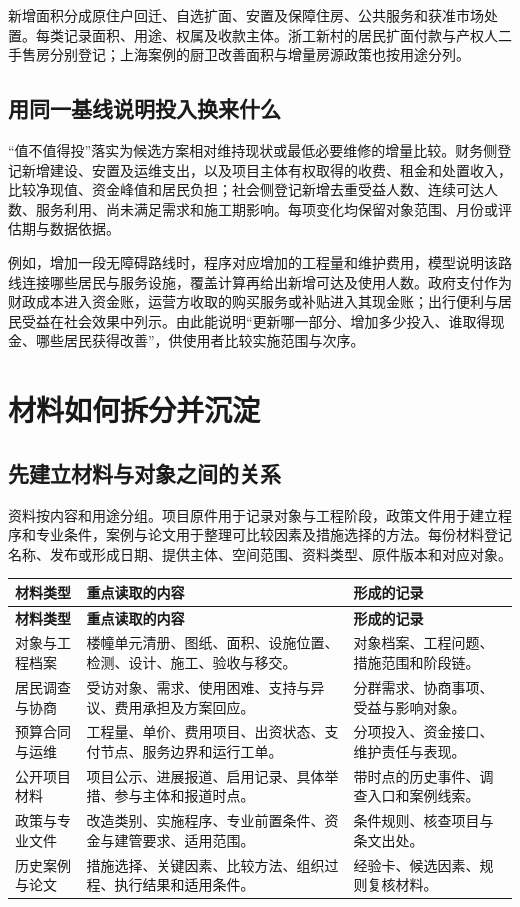 \documentclass[UTF8,11pt,fontset=windows]{ctexart}
\begin{document}
新增面积分成原住户回迁、自选扩面、安置及保障住房、公共服务和获准市场处置。每类记录面积、用途、权属及收款主体。浙工新村的居民扩面付款与产权人二手售房分别登记；上海案例的厨卫改善面积与增量房源政策也按用途分列。\cite{zhegongdata,shmix}

\subsection{用同一基线说明投入换来什么}

“值不值得投”落实为候选方案相对维持现状或最低必要维修的增量比较。财务侧登记新增建设、安置及运维支出，以及项目主体有权取得的收费、租金和处置收入，比较净现值、资金峰值和居民负担；社会侧登记新增去重受益人数、连续可达人数、服务利用、尚未满足需求和施工期影响。每项变化均保留对象范围、月份或评估期与数据依据。

例如，增加一段无障碍路线时，程序对应增加的工程量和维护费用，模型说明该路线连接哪些居民与服务设施，覆盖计算再给出新增可达及使用人数。政府支付作为财政成本进入资金账，运营方收取的购买服务或补贴进入其现金账；出行便利与居民受益在社会效果中列示。由此能说明“更新哪一部分、增加多少投入、谁取得现金、哪些居民获得改善”，供使用者比较实施范围与次序。

\section{材料如何拆分并沉淀}

\subsection{先建立材料与对象之间的关系}

资料按内容和用途分组。项目原件用于记录对象与工程阶段，政策文件用于建立程序和专业条件，案例与论文用于整理可比较因素及措施选择的方法。每份材料登记名称、发布或形成日期、提供主体、空间范围、资料类型、原件版本和对应对象。

\begin{longtable}{@{}L{28mm}L{72mm}L{59mm}@{}}
\toprule
\textbf{材料类型} & \textbf{重点读取的内容} & \textbf{形成的记录}\\
\midrule
\endfirsthead
\toprule
\textbf{材料类型} & \textbf{重点读取的内容} & \textbf{形成的记录}\\
\midrule
\endhead
对象与工程档案 & 楼幢单元清册、图纸、面积、设施位置、检测、设计、施工、验收与移交。 & 对象档案、工程问题、措施范围和阶段链。\\
居民调查与协商 & 受访对象、需求、使用困难、支持与异议、费用承担及方案回应。 & 分群需求、协商事项、受益与影响对象。\\
预算合同与运维 & 工程量、单价、费用项目、出资状态、支付节点、服务边界和运行工单。 & 分项投入、资金接口、维护责任与表现。\\
公开项目材料 & 项目公示、进展报道、启用记录、具体举措、参与主体和报道时点。 & 带时点的历史事件、调查入口和案例线索。\\
政策与专业文件 & 改造类别、实施程序、专业前置条件、资金与建管要求、适用范围。 & 条件规则、核查项目与条文出处。\\
历史案例与论文 & 措施选择、关键因素、比较方法、组织过程、执行结果和适用条件。 & 经验卡、候选因素、规则复核材料。\\
\bottomrule
\end{longtable}
\end{document}
